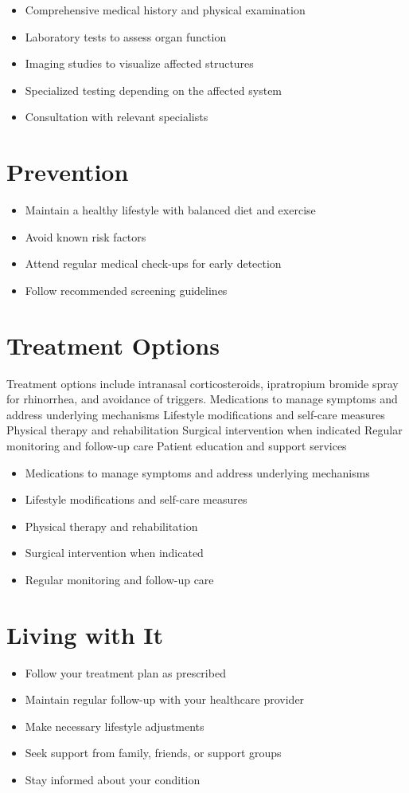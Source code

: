 \begin{itemize}[noitemsep]
  \item Comprehensive medical history and physical examination
  \item Laboratory tests to assess organ function
  \item Imaging studies to visualize affected structures
  \item Specialized testing depending on the affected system
  \item Consultation with relevant specialists
\end{itemize}
\section{Prevention}
\begin{itemize}[noitemsep]
  \item Maintain a healthy lifestyle with balanced diet and exercise
  \item Avoid known risk factors
  \item Attend regular medical check-ups for early detection
  \item Follow recommended screening guidelines
\end{itemize}
\section{Treatment Options}
Treatment options include intranasal corticosteroids, ipratropium bromide spray for rhinorrhea, and avoidance of triggers. Medications to manage symptoms and address underlying mechanisms Lifestyle modifications and self-care measures Physical therapy and rehabilitation Surgical intervention when indicated Regular monitoring and follow-up care Patient education and support services

\begin{itemize}[noitemsep]
  \item Medications to manage symptoms and address underlying mechanisms
  \item Lifestyle modifications and self-care measures
  \item Physical therapy and rehabilitation
  \item Surgical intervention when indicated
  \item Regular monitoring and follow-up care
\end{itemize}
\section{Living with It}
\begin{itemize}[noitemsep]
  \item Follow your treatment plan as prescribed
  \item Maintain regular follow-up with your healthcare provider
  \item Make necessary lifestyle adjustments
  \item Seek support from family, friends, or support groups
  \item Stay informed about your condition
\end{itemize}
